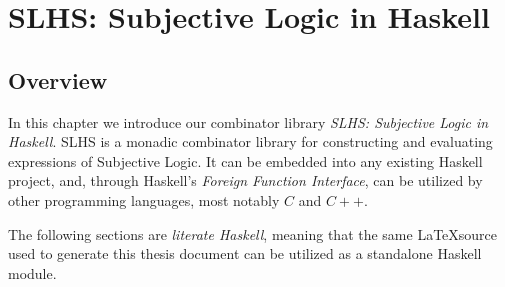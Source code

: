 \documentclass[thesis.tex]{subfiles}
\begin{document}
\chapter{SLHS: Subjective Logic in Haskell}

\section{Overview}

In this chapter we introduce our combinator library \emph{SLHS: Subjective Logic
in Haskell}. SLHS is a monadic combinator library for constructing and evaluating
expressions of Subjective Logic. It can be embedded into any existing Haskell
project, and, through Haskell's \emph{Foreign Function Interface}, can be utilized
by other programming languages, most notably $C$ and $C++$.

The following sections are \emph{literate Haskell}, meaning that the same
\LaTeX source used to generate this thesis document can be utilized as a standalone
Haskell module.

%
%






%





\end{document}
